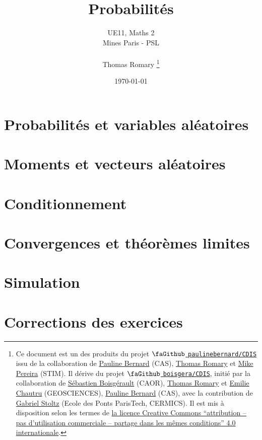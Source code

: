 \documentclass[french,a4paper,11pt,open=any,headings=small]{scrbook}
\title{Probabilités}
\author{UE11, Maths 2 \\
	Mines Paris - PSL\\~\\
	Thomas Romary \footnote{Ce document est un des produits
		du projet \href{https://github.com/}{\(\mbox{\faGithub}\)
			\texttt{paulinebernard/CDIS}} issu de la collaboration de
		\href{mailto:pauline.bernard@minesparis.psl.eu}{Pauline Bernard}
		(CAS), \href{mailto:thomas.romary@minesparis.psl.eu}{Thomas
			Romary} et \href{mailto:mike.pereira@minesparis.psl.eu}{Mike Pereira} (STIM). 
		Il dérive du projet  \href{https://github.com/}{\(\mbox{\faGithub}\)
			 \texttt{boisgera/CDIS}}, initié par la collaboration de
		 \href{mailto:sebastien.boisgerault@mines-paristech.fr}{Sébastien
			 Boisgérault} (CAOR),
		 \href{mailto:thomas.romary@mines-paristech.fr}{Thomas Romary} et
		 \href{mailto:emilie.chautru@mines-paristech.fr}{Emilie Chautru}
		 (GEOSCIENCES),
		 \href{mailto:pauline.bernard@mines-paristech.fr}{Pauline Bernard}
		 (CAS), avec la contribution de
		 \href{mailto:gabriel-stolz@mines-paristech.fr}{Gabriel Stoltz} (Ecole
		 des Ponts ParisTech, CERMICS). 
		Il est mis à disposition selon les
		termes de \href{http://creativecommons.org/licenses/by-nc-sa/}{la
			licence Creative Commons ``attribution -- pas d'utilisation
			commerciale -- partage dans les mêmes conditions'' 4.0
			internationale}.}}
\date{\today}
\begin{document}
\maketitle

\setcounter{tocdepth}{2}
\tableofcontents

\part{Probabilités et variables aléatoires}


\part{Moments et vecteurs aléatoires}


\part{Conditionnement}


\part{Convergences et théorèmes limites}


\part{Simulation}


\ifcorrections
\part{Corrections des exercices}





\fi
\end{document}
